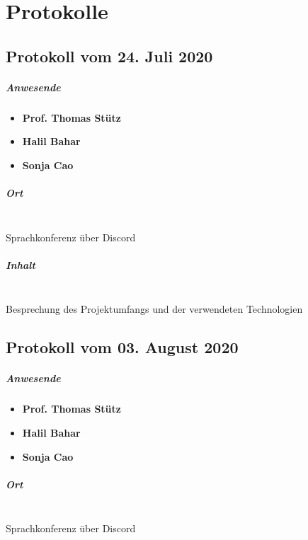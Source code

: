 \chapter{Protokolle}
\section{Protokoll vom 24. Juli 2020}
\paragraph{Anwesende}
\begin{itemize}
	\item{\textbf{Prof. Thomas Stütz}}
	\item{\textbf{Halil Bahar}}
	\item{\textbf{Sonja Cao}}
\end{itemize}

\paragraph{Ort}\mbox{}\\
Sprachkonferenz über Discord

\paragraph{Inhalt}\mbox{}\\
Besprechung des Projektumfangs und der verwendeten Technologien

\section{Protokoll vom 03. August 2020}

\paragraph{Anwesende}
\begin{itemize}
	\item{\textbf{Prof. Thomas Stütz}}
	\item{\textbf{Halil Bahar}}
	\item{\textbf{Sonja Cao}}
\end{itemize}

\paragraph{Ort}\mbox{}\\
Sprachkonferenz über Discord

